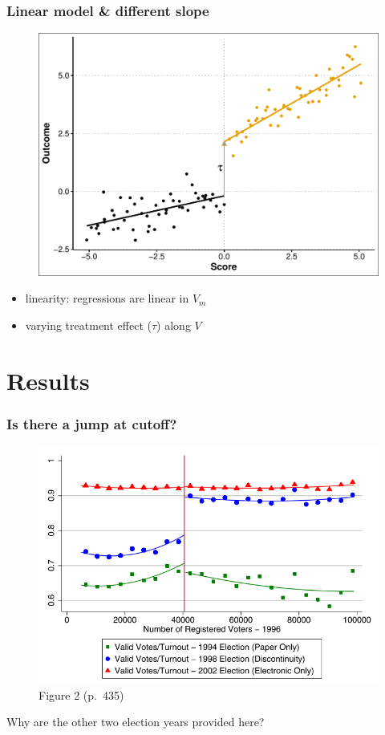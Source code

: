 \documentclass[12pt,english,dvipsnames,aspectratio=169,handout]{beamer}\usepackage[]{graphicx}\usepackage[]{xcolor}
\begin{document}
\begin{frame}
\frametitle{Linear model \& different slope}

\begin{figure}
\centering
\includegraphics[scale=0.35]{../04-figures/07/10.pdf}
\end{figure}
\pause

\begin{itemize}
\footnotesize
\item linearity: regressions are linear in $V_m$
\item varying treatment effect ($\tau$) along $V$
\end{itemize}

\end{frame}


\section{Results}

\begin{frame}
\frametitle{Is there a jump at cutoff?}

\begin{figure}
\centering
\includegraphics[scale=0.4]{../04-figures/07/19.PNG}
\caption{Figure 2 (p.~435)}
\end{figure}

Why are the other two election years provided here?
\end{frame}
\end{document}
